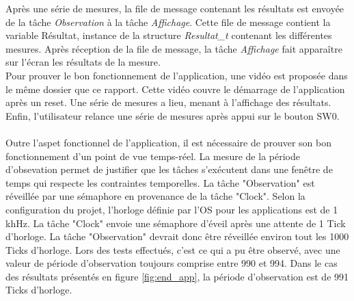 \indent Après une série de mesures, la file de message contenant les résultats est envoyée de la tâche \textit{Observation} à la tâche \textit{Affichage}.
Cette file de message contient la variable Résultat, instance de la structure \textit{Resultat\_t} contenant les différentes mesures.
Après réception de la file de message, la tâche \textit{Affichage} fait apparaître sur l'écran les résultats de la mesure.
\\
\indent Pour prouver le bon fonctionnement de l'application, une vidéo est proposée dans le même dossier que ce rapport.
Cette vidéo couvre le démarrage de l'application après un reset. 
Une série de mesures a lieu, menant à l'affichage des résultats.
Enfin, l'utilisateur relance une série de mesures après appui sur le bouton SW0.
\\\\
\indent Outre l'aspet fonctionnel de l'application, il est nécessaire de prouver son bon fonctionnement d'un point de vue temps-réel.
La mesure de la période d'obsevation permet de justifier que les tâches s'exécutent dans une fenêtre de temps qui respecte les contraintes temporelles.
La tâche "Observation" est réveillée par une sémaphore en provenance de la tâche "Clock".
Selon la configuration du projet, l'horloge définie par l'OS pour les applications est de 1 khHz.
La tâche "Clock" envoie une sémaphore d'éveil après une attente de 1 Tick d'horloge.
La tâche "Observation" devrait donc être réveillée environ tout les 1000 Ticks d'horloge.
Lors des tests effectués, c'est ce qui a pu être observé, avec une valeur de période d'observation toujours comprise entre 990 et 994.
Dans le cas des résultats présentés en figure \ref{fig:end_app}, la période d'observation est de 991 Ticks d'horloge.
